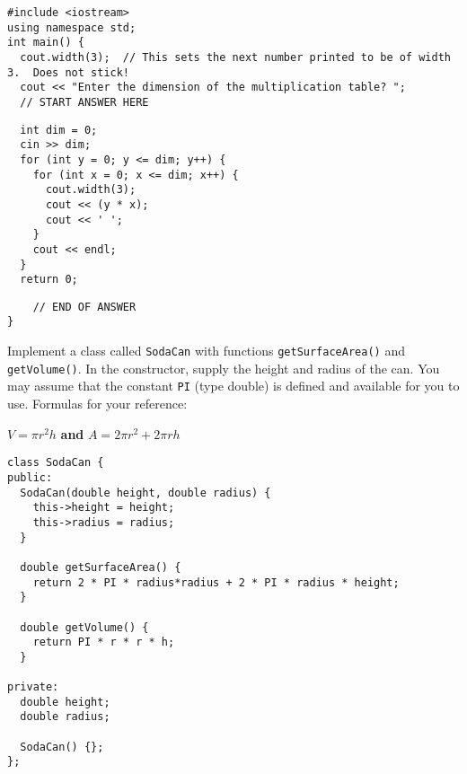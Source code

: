 \documentclass[11pt,answers]{exam}
\begin{document}
\begin{questions}
\begin{verbatim}
#include <iostream>
using namespace std;
int main() {
  cout.width(3);  // This sets the next number printed to be of width 3.  Does not stick!
  cout << "Enter the dimension of the multiplication table? "; 
  // START ANSWER HERE
\end{verbatim}

\begin{solution}[4.5in]
\begin{verbatim}
  int dim = 0;
  cin >> dim;
  for (int y = 0; y <= dim; y++) {
    for (int x = 0; x <= dim; x++) {
      cout.width(3);
      cout << (y * x);
      cout << ' ';
    }
    cout << endl;
  }
  return 0;
\end{verbatim}
\end{solution}

\begin{verbatim}
    // END OF ANSWER
}
\end{verbatim}

\newpage
\bonusquestion[15] Implement a class called {\tt SodaCan} with functions {\tt getSurfaceArea()} and {\tt getVolume()}. In the constructor, supply the height and radius of the can. You may assume that the constant {\tt PI} (type double) is defined and available for you to use. Formulas for your reference:
\begin{center} 
  $V = \pi r^2h$ {\bf and} $A = 2 \pi r^2 + 2 \pi r h$
\end{center}

\begin{solution}
\begin{lstlisting}
class SodaCan {
public:
  SodaCan(double height, double radius) {
    this->height = height;
    this->radius = radius;
  }

  double getSurfaceArea() {
    return 2 * PI * radius*radius + 2 * PI * radius * height;	
  }

  double getVolume() {
	return PI * r * r * h;
  }

private: 
  double height;
  double radius;

  SodaCan() {};
};
\end{lstlisting}
\end{solution}

\end{questions}
\end{document}
